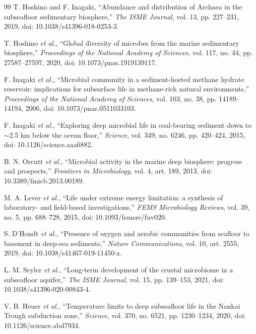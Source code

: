 \documentclass[conference]{../../../../Conference-LaTeX-template_10-17-19/IEEEtran}
\begin{document}
\begin{thebibliography}{99}
T. Hoshino and F. Inagaki, ``Abundance and distribution of Archaea in the subseafloor sedimentary biosphere,'' \textit{The ISME Journal}, vol. 13, pp. 227--231, 2019, doi: 10.1038/s41396-018-0253-3.

T. Hoshino \textit{et al.}, ``Global diversity of microbes from the marine sedimentary biosphere,'' \textit{Proceedings of the National Academy of Sciences}, vol. 117, no. 44, pp. 27587--27597, 2020, doi: 10.1073/pnas.1919139117.

F. Inagaki \textit{et al.}, ``Microbial community in a sediment-hosted methane hydrate reservoir: implications for subsurface life in methane-rich natural environments,'' \textit{Proceedings of the National Academy of Sciences}, vol. 103, no. 38, pp. 14189--14194, 2006, doi: 10.1073/pnas.0511033103.

F. Inagaki \textit{et al.}, ``Exploring deep microbial life in coal-bearing sediment down to $\sim$2.5 km below the ocean floor,'' \textit{Science}, vol. 349, no. 6246, pp. 420--424, 2015, doi: 10.1126/science.aaa6882.

B. N. Orcutt \textit{et al.}, ``Microbial activity in the marine deep biosphere: progress and prospects,'' \textit{Frontiers in Microbiology}, vol. 4, art. 189, 2013, doi: 10.3389/fmicb.2013.00189.

M. A. Lever \textit{et al.}, ``Life under extreme energy limitation: a synthesis of laboratory- and field-based investigations,'' \textit{FEMS Microbiology Reviews}, vol. 39, no. 5, pp. 688--728, 2015, doi: 10.1093/femsre/fuv020.

S. D'Hondt \textit{et al.}, ``Presence of oxygen and aerobic communities from seafloor to basement in deep-sea sediments,'' \textit{Nature Communications}, vol. 10, art. 2555, 2019, doi: 10.1038/s41467-019-11450-z.

L. M. Seyler \textit{et al.}, ``Long-term development of the crustal microbiome in a subseafloor aquifer,'' \textit{The ISME Journal}, vol. 15, pp. 139--153, 2021, doi: 10.1038/s41396-020-00843-4.

V. B. Heuer \textit{et al.}, ``Temperature limits to deep subseafloor life in the Nankai Trough subduction zone,'' \textit{Science}, vol. 370, no. 6521, pp. 1230--1234, 2020, doi: 10.1126/science.abd7934.


\end{thebibliography}
\end{document}
